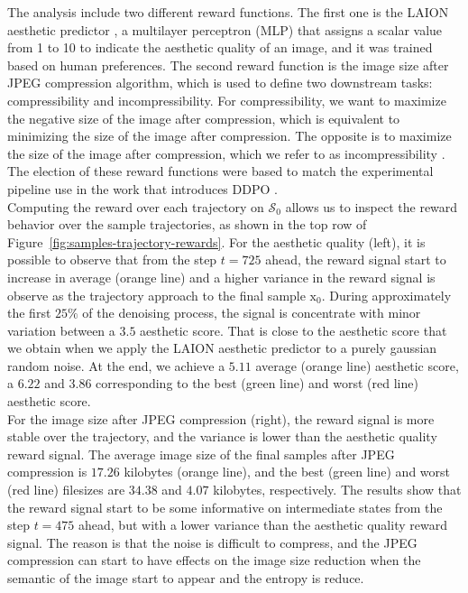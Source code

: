 
\noindent The analysis include two different reward functions. The first one is the LAION aesthetic predictor \cite{laion2022}, a multilayer perceptron (MLP) that assigns a scalar value from 1 to 10 to indicate the aesthetic quality of an image, and it was trained based on human preferences. The second reward function is the image size after JPEG compression algorithm, which is used to define two downstream tasks: compressibility and incompressibility. For compressibility, we want to maximize the negative size of the image after compression, which is equivalent to minimizing the size of the image after compression. The opposite is to maximize the size of the image after compression, which we refer to as incompressibility . The election of these reward functions were based to match the experimental pipeline use in the work that introduces DDPO \cite{black2023training}. \\

\noindent Computing the reward over each trajectory on $\mathcal{S}_{0}$ allows us to inspect the reward behavior over the sample trajectories, as shown in the top row of Figure~\ref{fig:samples-trajectory-rewards}. For the aesthetic quality (left), it is possible to observe that from the step $t=725$ ahead, the reward signal start to increase in average (orange line) and a higher variance in the reward signal is observe as the trajectory approach to the final sample $\mathrm{x}_{0}$. During approximately the first $25\%$ of the denoising process, the signal is concentrate with minor variation between a $3.5$ aesthetic score. That is close to the aesthetic score that we obtain when we apply the LAION aesthetic predictor to a purely gaussian random noise. At the end, we achieve a $5.11$ average (orange line) aesthetic score, a $6.22$ and $3.86$ corresponding to the best (green line) and worst (red line) aesthetic score. \\

\noindent For the image size after JPEG compression (right), the reward signal is more stable over the trajectory, and the variance is lower than the aesthetic quality reward signal. The average image size of the final samples after JPEG compression is $17.26$ kilobytes (orange line), and the best (green line) and worst (red line) filesizes are $34.38$ and $4.07$ kilobytes, respectively. The results show that the reward signal start to be some informative on intermediate states from the step $t=475$ ahead, but with a lower variance than the aesthetic quality reward signal. The reason is that the noise is difficult to compress, and the JPEG compression can start to have effects on the image size reduction when the semantic of the image start to appear and the entropy is reduce.  \\

